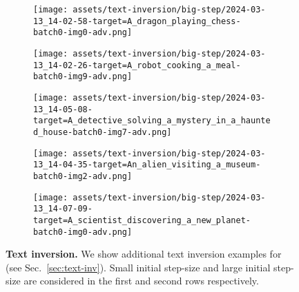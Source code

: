 \begin{figure*}[]
\vspace{1ex}
\begin{minipage}[t]{.025\textwidth}
     \vspace{0pt}
\end{minipage}%
\hspace{1ex}
\begin{minipage}[t]{0.98\textwidth}
    \vspace{0pt}
    \begin{subfigure}[t]{0.2\textwidth}
        \texttt{[image: assets/text-inversion/big-step/2024-03-13\_14-02-58-target=A\_dragon\_playing\_chess-batch0-img0-adv.png]}
    \end{subfigure}%
    \begin{subfigure}[t]{0.2\textwidth}
        \texttt{[image: assets/text-inversion/big-step/2024-03-13\_14-02-26-target=A\_robot\_cooking\_a\_meal-batch0-img9-adv.png]}
    \end{subfigure}%
    \begin{subfigure}[t]{0.2\textwidth}
        \texttt{[image: assets/text-inversion/big-step/2024-03-13\_14-05-08-target=A\_detective\_solving\_a\_mystery\_in\_a\_haunted\_house-batch0-img7-adv.png]}
    \end{subfigure}%
    \begin{subfigure}[t]{0.2\textwidth}
        \texttt{[image: assets/text-inversion/big-step/2024-03-13\_14-04-35-target=An\_alien\_visiting\_a\_museum-batch0-img2-adv.png]}
    \end{subfigure}%
    \begin{subfigure}[t]{0.2\textwidth}
        \texttt{[image: assets/text-inversion/big-step/2024-03-13\_14-07-09-target=A\_scientist\_discovering\_a\_new\_planet-batch0-img0-adv.png]}
    \end{subfigure}%
\end{minipage}

\caption{\textbf{Text inversion.} We show additional text inversion examples for \rclip (see Sec.~\ref{sec:text-inv}). Small initial step-size and large initial step-size are considered in the first and second rows respectively.
}
\label{fig:text-inv-app}
\end{figure*}